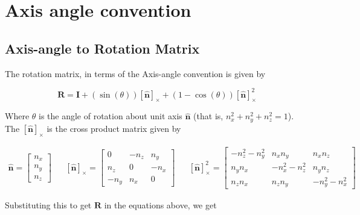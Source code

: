 
\section[A3: Axis-angle and SO(3)]{Axis angle convention}

\subsection*{Axis-angle to Rotation Matrix}

The rotation matrix, in terms of the Axis-angle convention is given by

\begin{equation}
    \mathbf{R} = \mathbf{I} + (\sin(\theta)) \left [ \mathbf{\hat{n}} \right ]_{\times} + (1-\cos(\theta)) \left [ \mathbf{\hat{n}} \right ]_{\times}^{2}
\end{equation}

Where $\theta$ is the angle of rotation about unit axis $\mathbf{\hat{n}}$ (that is, $n_x^2 + n_y^2 + n_z^2 = 1$). The $\left [ \mathbf{\hat{n}} \right ]_{\times}$ is the cross product matrix given by

\begin{align}
    \mathbf{\hat{n}} = \begin{bmatrix}
        n_x \\ n_y \\ n_z
        \end{bmatrix} &&
    \left [ \mathbf{\hat{n}} \right ]_{\times} = \begin{bmatrix}
        0 & -n_z & n_y \\
        n_z & 0 & -n_x \\
        -n_y & n_x & 0
        \end{bmatrix} &&
    \left [ \mathbf{\hat{n}} \right ]_{\times}^{2} = \begin{bmatrix}
        -n_z^2-n_y^2 & n_x n_y & n_x n_z \\
        n_y n_x & -n_x^2-n_z^2 & n_y n_z \\
        n_z n_x & n_z n_y & -n_y^2-n_x^2
        \end{bmatrix}
\end{align}

Substituting this to get $\mathbf{R}$ in the equations above, we get

